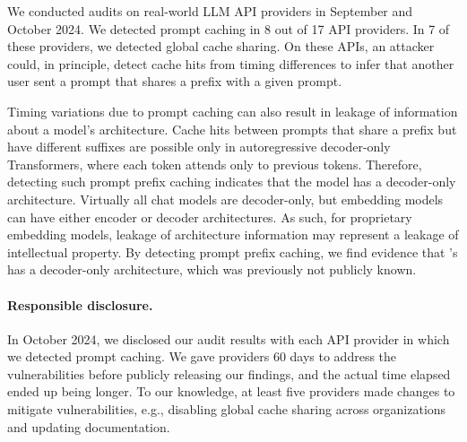 We conducted audits on real-world LLM API providers in September and October 2024. We detected prompt caching in 8 out of 17 API providers. In 7 of these providers, we detected global cache sharing. On these APIs, an attacker could, in principle, detect cache hits from timing differences to infer that another user sent a prompt that shares a prefix with a given prompt.

Timing variations due to prompt caching can also result in leakage of information about a model's architecture. Cache hits between prompts that share a prefix but have different suffixes are possible only in autoregressive decoder-only Transformers, where each token attends only to previous tokens. Therefore, detecting such prompt prefix caching indicates that the model has a decoder-only architecture. Virtually all chat models are decoder-only, but embedding models can have either encoder or decoder architectures. As such, for proprietary embedding models, leakage of architecture information may represent a leakage of intellectual property. By detecting prompt prefix caching, we find evidence that \OpenAI{}'s \OpenAIEmbeddingModel{} has a decoder-only architecture, which was previously not publicly known.

\paragraph{Responsible disclosure.}
In October 2024, we disclosed our audit results with each API provider in which we detected prompt caching. We gave providers 60 days to address the vulnerabilities before publicly releasing our findings, and the actual time elapsed ended up being longer. To our knowledge, at least five providers made changes to mitigate vulnerabilities, e.g., disabling global cache sharing across organizations and updating documentation.






